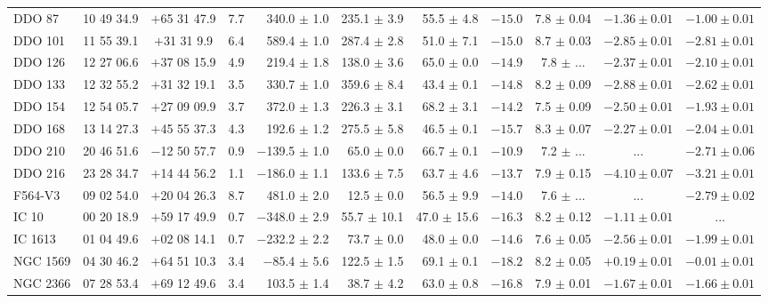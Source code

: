 \documentclass[natbib209]{emulateapj}
\begin{document}
\begin{table}
{\begin{tabular}{@{}lccrrrrrccc}
DDO 87 	    & 10 49 34.9 & 	$+$65 31 47.9  & 7.7  & 340.0 $\pm$	1.0 &  235.1 $\pm$ 3.9 & 55.5 $\pm$ 4.8 & $-15.0$	& 7.8 $\pm$ 0.04	& $-1.36 \pm 0.01$	& $-1.00 \pm 0.01$  \\
DDO 101     & 11 55 39.1 &  $+$31 31 9.9   & 6.4  & 589.4 $\pm$	1.0 &  287.4 $\pm$ 2.8 & 51.0 $\pm$ 7.1 & $-15.0$	& 8.7 $\pm$ 0.03	& $-2.85 \pm 0.01$	& $-2.81 \pm 0.01$ \\
DDO 126     & 12 27 06.6 &  $+$37 08 15.9  & 4.9  & 219.4 $\pm$	1.8 &  138.0 $\pm$ 3.6 & 65.0 $\pm$ 0.0 & $-14.9$	& 7.8 $\pm$ $...$ 	& $-2.37 \pm 0.01$ 	& $-2.10 \pm 0.01$   \\
DDO 133     & 12 32 55.2 &  $+$31 32 19.1  & 3.5  & 330.7 $\pm$	1.0 &  359.6 $\pm$ 8.4 & 43.4 $\pm$ 0.1 & $-14.8$	& 8.2 $\pm$ 0.09    & $-2.88 \pm 0.01$	& $-2.62 \pm 0.01$ \\
DDO 154     & 12 54 05.7 &  $+$27 09 09.9  & 3.7  & 372.0 $\pm$	1.3 &  226.3 $\pm$ 3.1 & 68.2 $\pm$ 3.1 & $-14.2$	& 7.5 $\pm$ 0.09	& $-2.50 \pm 0.01$	& $-1.93 \pm 0.01$ \\
DDO 168     & 13 14 27.3 &  $+$45 55 37.3  & 4.3  & 192.6 $\pm$	1.2 &  275.5 $\pm$ 5.8 & 46.5 $\pm$ 0.1 & $-15.7$	& 8.3 $\pm$ 0.07	& $-2.27 \pm 0.01$	& $-2.04 \pm 0.01$ \\
DDO 210     & 20 46 51.6 &  $-$12 50 57.7  & 0.9  & $-$139.5 $\pm$ 1.0 &  65.0 $\pm$ 0.0 & 66.7 $\pm$ 0.1 & $-10.9$	& 7.2 $\pm$ $...$   & $...$ 			& $-2.71 \pm 0.06$   \\
DDO 216     & 23 28 34.7 &  $+$14 44 56.2  & 1.1  & $-$186.0 $\pm$ 1.1 &  133.6 $\pm$ 7.5 & 63.7 $\pm$ 4.6 & $-13.7$	& 7.9 $\pm$ 0.15	& $-4.10 \pm 0.07$	& $-3.21 \pm 0.01$ \\
F564-V3     & 09 02 54.0 &  $+$20 04 26.3  & 8.7  & 481.0 $\pm$	2.0 &  12.5 $\pm$ 0.0 & 56.5 $\pm$ 9.9 & $-14.0$	& 7.6 $\pm$ $...$ 	& $...$  			& $-2.79 \pm 0.02$   \\
IC 10		& 00 20 18.9 &  $+$59 17 49.9  & 0.7  & $-$348.0 $\pm$ 2.9 &  55.7 $\pm$ 10.1 & 47.0 $\pm$ 15.6 & $-16.3$		& 8.2 $\pm$ 0.12	& $-1.11 \pm 0.01$	& $...$ \\
IC 1613     & 01 04 49.6 &  $+$02 08 14.1  & 0.7  & $-$232.2 $\pm$ 2.2 &  73.7 $\pm$ 0.0 & 48.0 $\pm$ 0.0 & $-14.6$	& 7.6 $\pm$ 0.05	        & $-2.56 \pm 0.01$	& $-1.99 \pm 0.01$ \\
NGC 1569    & 04 30 46.2 &  $+$64 51 10.3  & 3.4  & $-$85.4 $\pm$ 5.6 &  122.5 $\pm$ 1.5 & 69.1 $\pm$ 0.1 & $-18.2$		& 8.2 $\pm$ 0.05	& $+0.19 \pm 0.01$	& $-0.01 \pm 0.01$ \\
NGC 2366    & 07 28 53.4 &  $+$69 12 49.6  & 3.4  & 103.5 $\pm$ 1.4  &  38.7 $\pm$ 4.2 & 63.0 $\pm$ 0.8 & $-16.8$	& 7.9 $\pm$ 0.01	& $-1.67 \pm 0.01$	& $-1.66 \pm 0.01$ \\

\end{tabular}}
\end{table}
\end{document}
